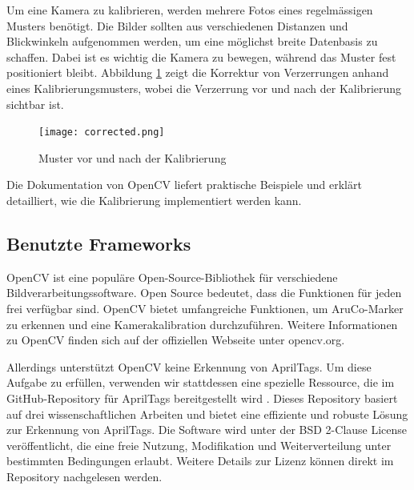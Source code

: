 Um eine Kamera zu kalibrieren, werden mehrere Fotos eines regelmässigen Musters 
benötigt. Die Bilder sollten aus verschiedenen Distanzen und Blickwinkeln aufgenommen werden,
um eine möglichst breite Datenbasis zu schaffen. Dabei ist es wichtig die Kamera zu bewegen, während
das Muster fest positioniert bleibt. Abbildung \ref{fig:corrected} zeigt die Korrektur von Verzerrungen
anhand eines Kalibrierungsmusters, wobei die Verzerrung vor und nach der Kalibrierung sichtbar ist.

\begin{figure}[H]
    \texttt{[image: corrected.png]}
    \caption{Muster vor und nach der Kalibrierung}
    \label{fig:corrected}
\end{figure}

Die Dokumentation von OpenCV \cite{opencv_calibration_tutorial} liefert praktische 
Beispiele und erklärt detailliert, wie die Kalibrierung implementiert werden 
kann.


\subsection{Benutzte Frameworks}
OpenCV ist eine populäre Open-Source-Bibliothek für verschiedene Bildverarbeitungssoftware.
Open Source bedeutet, dass die Funktionen für jeden frei verfügbar sind. OpenCV bietet 
umfangreiche Funktionen, um AruCo-Marker zu erkennen und eine Kamerakalibration durchzuführen.
Weitere Informationen zu OpenCV finden sich auf der offiziellen Webseite unter opencv.org.

Allerdings unterstützt OpenCV keine Erkennung von AprilTags. Um diese Aufgabe zu erfüllen, verwenden 
wir stattdessen eine spezielle Ressource, die im GitHub-Repository für AprilTags bereitgestellt 
wird \cite{apriltag_github}. Dieses Repository basiert auf drei wissenschaftlichen Arbeiten 
\cite{olson2011tags} \cite{wang2016iros} \cite{krogius2019iros} und bietet eine effiziente 
und robuste Lösung zur Erkennung von AprilTags. Die Software wird unter der BSD 2-Clause License 
veröffentlicht, die eine freie Nutzung, Modifikation und Weiterverteilung unter bestimmten Bedingungen 
erlaubt. Weitere Details zur Lizenz können direkt im Repository nachgelesen werden.